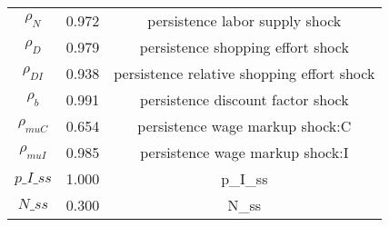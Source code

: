 \begin{center}
\begin{longtable}{ccc}
${\rho_N}$ 	 & 	 0.972 	 & 	 persistence labor supply shock\\
${\rho_D}$ 	 & 	 0.979 	 & 	 persistence shopping effort shock\\
${\rho_{DI}}$ 	 & 	 0.938 	 & 	 persistence relative shopping effort shock\\
${\rho_b}$ 	 & 	 0.991 	 & 	 persistence discount factor shock\\
${\rho_{muC}}$ 	 & 	 0.654 	 & 	 persistence wage markup shock:C\\
${\rho_{muI}}$ 	 & 	 0.985 	 & 	 persistence wage markup shock:I\\
$p\_I\_ss$ 	 & 	 1.000 	 & 	 p\_I\_ss\\
$N\_ss$ 	 & 	 0.300 	 & 	 N\_ss\\
\bottomrule%
\end{longtable}
\end{center}
